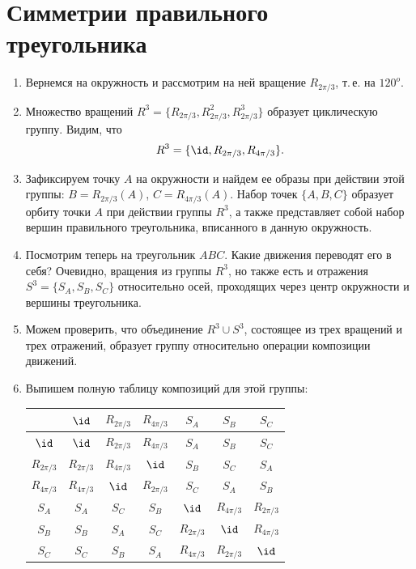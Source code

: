 \section{Симметрии правильного треугольника}


\begin{enumerate}
\item Вернемся на окружность и рассмотрим на ней вращение $R_{2\pi/3}$, т.\,е. на $120^o$.
\item Множество вращений $R^3=\{R_{2\pi/3},R_{2\pi/3}^2,R_{2\pi/3}^3\}$ образует циклическую группу. Видим, что
$$
R^3 = \{\id,R_{2\pi/3},R_{4\pi/3}\}.
$$
\item Зафиксируем точку $A$ на окружности и найдем ее образы при действии этой группы: $B=R_{2\pi/3}(A)$, $C=R_{4\pi/3}(A)$. Набор точек $\{A,B,C\}$ образует орбиту точки $A$ при действии группы $R^3$, а также представляет собой набор вершин правильного треугольника, вписанного в данную окружность.
\item Посмотрим теперь на треугольник $ABC$. Какие движения переводят его в себя? Очевидно, вращения из группы $R^3$, но также есть и отражения $S^3=\{S_A, S_B, S_C\}$ относительно осей, проходящих через центр окружности и вершины треугольника.
\item Можем проверить, что объединение $R^3\cup S^3$, состоящее из трех вращений и трех отражений, образует группу относительно операции композиции движений.
\item Выпишем полную таблицу композиций для этой группы:
\begin{table}[htb!]\begin{center}
\begin{tabular}{c||c|c|c||c|c|c|}
             & $\id$        & $R_{2\pi/3}$ & $R_{4\pi/3}$ & $S_A$        & $S_B$        & $S_C$  \\
\hline\hline
$\id$        & $\id$        & $R_{2\pi/3}$ & $R_{4\pi/3}$ & $S_A$        & $S_B$        & $S_C$  \\  \hline
$R_{2\pi/3}$ & $R_{2\pi/3}$ & $R_{4\pi/3}$ & $\id$        & $S_B$        & $S_C$        & $S_A$  \\  \hline
$R_{4\pi/3}$ & $R_{4\pi/3}$ & $\id$        & $R_{2\pi/3}$ & $S_C$        & $S_A$        & $S_B$  \\  \hline\hline
$S_A$        & $S_A$        & $S_C$        & $S_B$        & $\id$        & $R_{4\pi/3}$ & $R_{2\pi/3}$  \\  \hline
$S_B$        & $S_B$        & $S_A$        & $S_C$        & $R_{2\pi/3}$ & $\id$        & $R_{4\pi/3}$  \\  \hline
$S_C$        & $S_C$        & $S_B$        & $S_A$        & $R_{4\pi/3}$ & $R_{2\pi/3}$ & $\id$   \\  \hline
\end{tabular}
\end{center}\end{table}


\end{enumerate}
